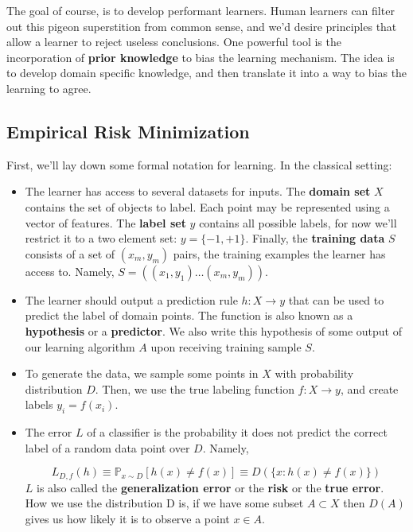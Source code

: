 \documentclass[11pt]{article}
\begin{document}
\noindent The goal of course, is to develop performant learners. Human learners can filter out this pigeon superstition from common sense,
and we'd desire principles that allow a learner to reject useless conclusions. One powerful tool is the incorporation of \textbf{prior knowledge}
to bias the learning mechanism. The idea is to develop domain specific knowledge, and then translate it into a way to bias the learning
to agree. 


\subsection{Empirical Risk Minimization}
First, we'll lay down some formal notation for learning. In the classical setting:
\begin{itemize}
    \item The learner has access to several datasets for inputs. The \textbf{domain set} \( X \) contains the set of objects to label. Each point may be
    represented using a vector of features. The \textbf{label set} \( y \) contains all possible labels, for now we'll restrict it to a two element set: \( y = \{-1, +1\}   \). 
    Finally, the \textbf{training data} \( S \) consists of a set of \( (x_{m}, y_{m}) \) pairs, the training examples the learner has access to. Namely, 
    \( S = ((x_{1}, y_{1}) \ldots (x_{m}, y_{m})) \).
 
    \item The learner should output a prediction rule \( h \colon X \to y \) that can be used to predict the label of domain points. The function is also known as a 
    \textbf{hypothesis} or a \textbf{predictor}. We also write this hypothesis of some output of our learning algorithm \( A \) upon receiving training sample \( S \).

    \item To generate the data, we sample some points in \( X \) with probability distribution \( D \). Then, we use the true labeling function \( f \colon X \to y \),
    and create labels \( y_{i} = f(x_{i}) \).

    \item The error \( L \) of a classifier is the probability it does not predict the correct label of a random data point over \( D \). Namely,
    
    \[ 
        L_{D, f}(h) \equiv \mathbb{P}_{x \sim D}[h(x) \neq f(x)] \equiv D(\{x: h(x) \neq f(x)\}) 
    \]
    \( L \) is also called the \textbf{generalization error} or the \textbf{risk} or the \textbf{true error}. 
    How we use the distribution D is, if we have some subset \( A \subset X\) then \( D(A) \) gives us how likely it is to observe a point 
    \( x \in A \). 

\end{itemize}
\end{document}
